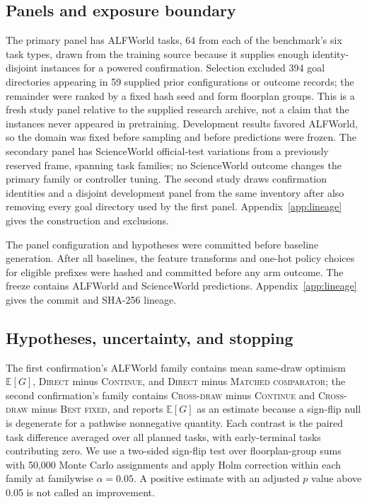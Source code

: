 \subsection{Panels and exposure boundary}

The primary panel has \AlfPlanned{} ALFWorld tasks, 64 from each of the benchmark's six task types, drawn from the training source because it supplies enough identity-disjoint instances for a powered confirmation. Selection excluded 394 goal directories appearing in 59 supplied prior configurations or outcome records; the remainder were ranked by a fixed hash seed and form \AlfGroups{} floorplan groups. This is a fresh study panel relative to the supplied research archive, not a claim that the instances never appeared in pretraining. Development results favored ALFWorld, so the domain was fixed before sampling and before predictions were frozen. The secondary panel has \SwPlanned{} ScienceWorld official-test variations from a previously reserved frame, spanning \SwGroups{} task families; no ScienceWorld outcome changes the primary family or controller tuning. The second study draws \EventPlanned{} confirmation identities and a disjoint development panel from the same inventory after also removing every goal directory used by the first panel. Appendix~\ref{app:lineage} gives the construction and exclusions.

The panel configuration and hypotheses were committed before baseline generation. After all baselines, the feature transforms and one-hot policy choices for \EligibleTotal{} eligible prefixes were hashed and committed before any arm outcome. The freeze contains \AlfEligible{} ALFWorld and \SwEligible{} ScienceWorld predictions. Appendix~\ref{app:lineage} gives the commit and SHA-256 lineage.

\subsection{Hypotheses, uncertainty, and stopping}

The first confirmation's ALFWorld family contains mean same-draw optimism $\mathbb E[G]$, \textsc{Direct} minus \textsc{Continue}, and \textsc{Direct} minus \textsc{Matched comparator}; the second confirmation's family contains \textsc{Cross-draw} minus \textsc{Continue} and \textsc{Cross-draw} minus \textsc{Best fixed}, and reports $\mathbb E[G]$ as an estimate because a sign-flip null is degenerate for a pathwise nonnegative quantity. Each contrast is the paired task difference averaged over all planned tasks, with early-terminal tasks contributing zero. We use a two-sided sign-flip test over floorplan-group sums with 50,000 Monte Carlo assignments and apply Holm correction within each family at familywise $\alpha=0.05$. A positive estimate with an adjusted $p$ value above 0.05 is not called an improvement.

